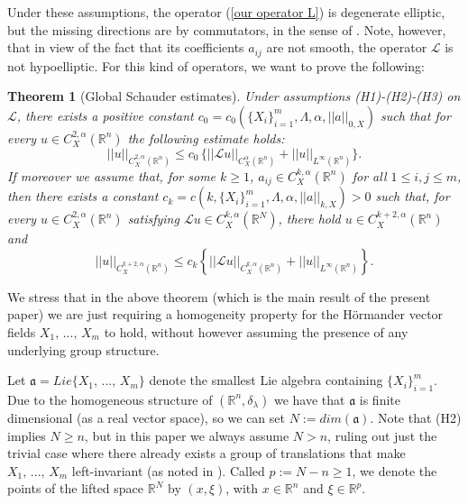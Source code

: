 \documentclass{article}
\newtheorem{theorem}{Theorem}[section]
\numberwithin{equation}{section}
\begin{document}
Under these assumptions, the operator (\ref{our operator L}) is degenerate elliptic, but the missing directions are  by commutators, in the sense of \cite{Hörmander's holy graal}. Note, however, that in view of the fact that its coefficients $a_{ij}$ are not smooth, the operator $\mathcal{L}$ is not hypoelliptic. For this kind of operators, we want to prove the following:

\vspace{2mm}

\begin{theorem}[Global Schauder estimates]
\label{global C^alpha estimate thm}
    Under assumptions (H1)-(H2)-(H3) on $\mathcal{L}$, there exists a positive constant $c_0=c_0( \{X_i\}_{i=1}^m,\Lambda, \alpha, ||a||_{0,X})$ such that for every $u \in C^{2,\alpha}_X(\mathbb{R}^n)$ the following estimate holds:
    \begin{equation}
    \label{global C^alpha estimate}
        ||u||_{C^{2,\alpha}_X(\mathbb{R}^n)} \leq c_0 \, \{||\mathcal{L}u||_{C^{\alpha}_X(\mathbb{R}^n)} + ||u||_{L^{\infty}(\mathbb{R}^n)} \}.
    \end{equation}
    If moreover we assume that, for some $k \geq 1$, $a_{ij} \in C^{k,\alpha}_X(\mathbb{R}^n)$ for all $1 \leq i,j \leq m$, then there exists a constant $c_k=c(k,\{X_i\}_{i=1}^m, \Lambda, \alpha, ||a||_{k,X})>0$ such that, for every $u \in C^{2,\alpha}_X(\mathbb{R}^n)$ satisfying $\mathcal{L} u \in C^{k,\alpha}_X(\mathbb{R}^N)$, there hold $u \in C^{k+2,\alpha}_X(\mathbb{R}^n)$ and
    \begin{equation*}
        ||u||_{C^{k+2,\alpha}_X(\mathbb{R}^n)} \leq c_k \left\{ ||\mathcal{L} u||_{C^{k,\alpha}_X(\mathbb{R}^n)} + ||u||_{L^{\infty}(\mathbb{R}^n)} \right\}.
    \end{equation*}
\end{theorem}

\vspace{2mm}

We stress that in the above theorem (which is the main result of the present paper) we are just requiring a homogeneity property for the Hörmander vector fields $X_1, \, ..., \, X_m$ to hold, without however assuming the presence of any underlying group structure.

\vspace{2mm}

Let $\mathfrak{a}=Lie\{X_1, \, ..., \, X_m\}$ denote the smallest Lie algebra containing $\{X_i\}_{i=1}^m$. Due to the homogeneous structure of $(\mathbb{R}^n, \delta_{\lambda})$ we have that $\mathfrak{a}$ is finite dimensional (as a real vector space), so we can set $N:=dim(\mathfrak{a})$.
Note that (H2) implies $N \geq n$, but in this paper we always assume $N>n$, ruling out just the trivial case where there already exists a group of translations that make $X_1, \, ..., \, X_m$ left-invariant (as noted in \cite[Section 2]{Gauss bounds with a_ij (BB)}).
Called $p:=N-n\geq 1$, we denote the points of the lifted space $\mathbb{R}^N$ by $(x,\xi)$, with $x \in \mathbb{R}^n$ and $\xi \in \mathbb{R}^p$.
\end{document}
